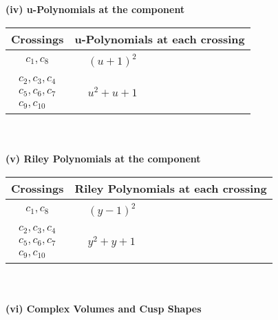 \documentclass[1p]{elsarticle_modified}
\theoremstyle{definition}
\begin{document}
\newpage\renewcommand{\arraystretch}{1}
\flushleft \textbf{(iv) u-Polynomials at the component}\newline \\
\begin{tabular}{m{50pt}|m{274pt}}
Crossings & \hspace{64pt}u-Polynomials at each crossing \\
\hline $$\begin{aligned}c_{1},c_{8}\end{aligned}$$&$\begin{aligned}
&(u+1)^2
\end{aligned}$\\
\hline $$\begin{aligned}c_{2},c_{3},c_{4}\\c_{5},c_{6},c_{7}\\c_{9},c_{10}\end{aligned}$$&$\begin{aligned}
&u^2+u+1
\end{aligned}$\\
\hline
\end{tabular}\\~\\
\newpage\renewcommand{\arraystretch}{1}
\flushleft \textbf{(v) Riley Polynomials at the component}\newline \\
\begin{tabular}{m{50pt}|m{274pt}}
Crossings & \hspace{64pt}Riley Polynomials at each crossing \\
\hline $$\begin{aligned}c_{1},c_{8}\end{aligned}$$&$\begin{aligned}
&(y-1)^2
\end{aligned}$\\
\hline $$\begin{aligned}c_{2},c_{3},c_{4}\\c_{5},c_{6},c_{7}\\c_{9},c_{10}\end{aligned}$$&$\begin{aligned}
&y^2+y+1
\end{aligned}$\\
\hline
\end{tabular}\\~\\
\newpage\flushleft \textbf{(vi) Complex Volumes and Cusp Shapes}
\end{document}
